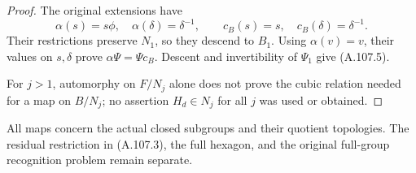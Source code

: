 \begin{proof}
The original extensions have
\[
 \alpha(s)=s\phi,\quad \alpha(\delta)=\delta^{-1},
 \qquad c_B(s)=s,\quad c_B(\delta)=\delta^{-1}.
\]
Their restrictions preserve \(N_1\), so they descend to \(B_1\).
Using \(\alpha(v)=v\), their values on \(s,\delta\) prove
\(\alpha\Psi=\Psi c_B\). Descent and invertibility of \(\Psi_1\)
give (A.107.5).

For \(j>1\), automorphy on \(F/N_j\) alone does not prove the cubic
relation needed for a map on \(B/N_j\); no assertion \(H_d\in N_j\)
for all \(j\) was used or obtained.
\end{proof}

All maps concern the actual closed subgroups and their quotient
topologies. The residual restriction in (A.107.3), the full hexagon,
and the original full-group recognition problem remain separate.

